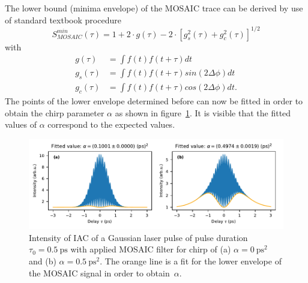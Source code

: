 The lower bound (minima envelope) of the MOSAIC trace can be derived by use of standard textbook procedure~\cite{klein_optics_1986}
\begin{equation}
S^{min}_{MOSAIC}(\tau)= 1 + 2 \cdot g(\tau) - 2 \cdot [g_s^2(\tau)+g_c^2(\tau)]^{1/2}
\end{equation}
with
\begin{align}
g(\tau)&=\int f(t)f(t+\tau)dt\\
g_s(\tau)&=\int f(t)f(t+\tau)sin(2\Delta\phi)dt\\
g_c(\tau)&=\int f(t)f(t+\tau)cos(2\Delta\phi)dt.
\end{align}
The points of the lower envelope determined before can now be fitted in order to obtain the chirp parameter $\alpha$ as shown in figure~\ref{fig:mosaicchirpedlaserpulsefitenvelope}.
It is visible that the fitted values of $\alpha$ correspond to the expected values.
\begin{figure}[H]
	\centering
	\includegraphics[width=\linewidth]{figures/chirp/plots/mosaic_chirped_laser_pulse_fit_envelope}
	\caption[Intensity of IAC of a Gaussian laser pulse of pulse duration $\tau_0=\SI{0.5}{\pico \second}$ with applied MOSAIC filter and fitted $\alpha$-values.]{Intensity of IAC of a Gaussian laser pulse of pulse duration $\tau_0=\SI{0.5}{\pico \second}$ with applied MOSAIC filter for chirp of (a) $\alpha = \SI{0}{\pico \second \squared}$ and (b) $\alpha = \SI{0.5}{\pico \second \squared}$.
		The orange line is a fit for the lower envelope of the MOSAIC signal in order to obtain~$\alpha$.}
	\label{fig:mosaicchirpedlaserpulsefitenvelope}
\end{figure}

